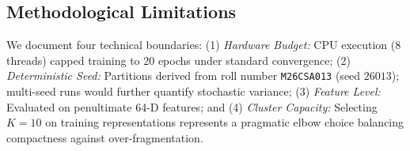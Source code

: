 \subsection{Methodological Limitations}
We document four technical boundaries: (1) \textit{Hardware Budget:} CPU execution (8 threads) capped training to 20 epochs under standard convergence; (2) \textit{Deterministic Seed:} Partitions derived from roll number \texttt{M26CSA013} (seed $26013$); multi-seed runs would further quantify stochastic variance; (3) \textit{Feature Level:} Evaluated on penultimate 64-D features; and (4) \textit{Cluster Capacity:} Selecting $K=10$ on training representations represents a pragmatic elbow choice balancing compactness against over-fragmentation.
